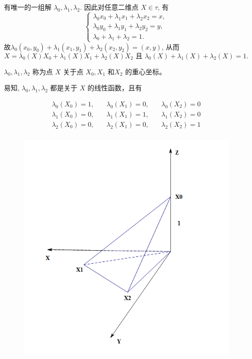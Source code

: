 \documentclass[12pt,a4paper]{article}
\begin{document}
有唯一的一组解 $\lambda_0,\lambda_1,\lambda_2$. 
因此对任意二维点 $X\in\tau$, 有
$$
\begin{cases}
\lambda _0 x_0+\lambda _1 x_1+\lambda _2 x_2=x,\\
\lambda _0 y_0+\lambda _1 y_1+\lambda _2 y_2=y,\\
\lambda _0+ \lambda _1 +\lambda _2 =1.
\end{cases}
$$
故$\lambda _0 (x_0,y_0)+\lambda _1 (x_1,y_1)+\lambda _2 (x_2,y_2)=(x,y)$,
从而
$$
X=\lambda_0(X) X_0 + \lambda_1(X)X_1 + \lambda_2(X)X_2 
\text{ 且 } \lambda_0(X) + \lambda_1(X) + \lambda_2(X) = 1. 
$$

$\lambda_0,\lambda_1,\lambda_2$ 称为点 $X$ 关于点 $X_0,X_1$ 和$X_2$ 的重心坐标。

易知, $\lambda_0, \lambda_1, \lambda_2$ 都是关于 $X$ 的线性函数，且有

\begin{eqnarray*}
\lambda_0(X_0) = 1,\quad & \lambda_0(X_1) = 0,\quad& \lambda_0(X_2) = 0\\
\lambda_1(X_0) = 0,\quad & \lambda_1(X_1) = 1,\quad& \lambda_1(X_2) = 0\\
\lambda_2(X_0) = 0,\quad & \lambda_2(X_1) = 0,\quad & \lambda_2(X_2) = 1\\
\end{eqnarray*}

\begin{figure}[H]
\centering
\includegraphics[scale=0.7]{./figures/3.png}
\caption{}
\end{figure}
\end{document}
